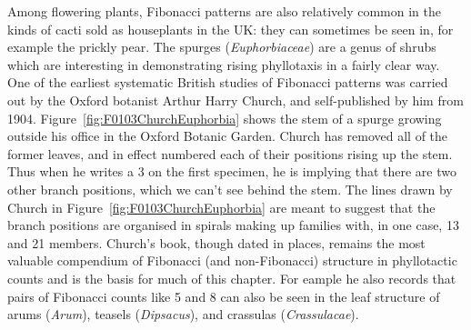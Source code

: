 Among flowering plants, Fibonacci patterns are also relatively common in the kinds of cacti sold as houseplants in the UK: they can sometimes be seen in, for example the prickly pear. The spurges (\textit{Euphorbiaceae}) are a genus of shrubs which are interesting in demonstrating rising phyllotaxis in a fairly clear way. One of the earliest systematic British studies of Fibonacci patterns was carried out by the Oxford botanist Arthur Harry Church, and self-published by him from 1904.  Figure~\ref{fig:F0103ChurchEuphorbia} shows the stem of a spurge growing outside his office in the Oxford Botanic Garden.
%
Church has removed all of the former leaves, and in effect numbered each of their positions rising up the stem. Thus when he writes a 3 on the first specimen, he is implying that there are two other branch positions, which we can't see behind the stem. 
The lines drawn by Church in Figure~\ref{fig:F0103ChurchEuphorbia}  are meant to suggest that the branch positions are organised in spirals making up families with, in one case, 13 and 21 members.  Church's book, though dated in places, remains the most valuable compendium of Fibonacci (and non-Fibonacci) structure in phyllotactic counts and is the basis for much of this chapter. For eample he also records that pairs of Fibonacci counts like 5 and 8 can also be seen in the leaf structure of arums (\textit{Arum}), teasels (\textit{Dipsacus}), and crassulas (\textit{Crassulacae}).
 \\\mbox{}
 
